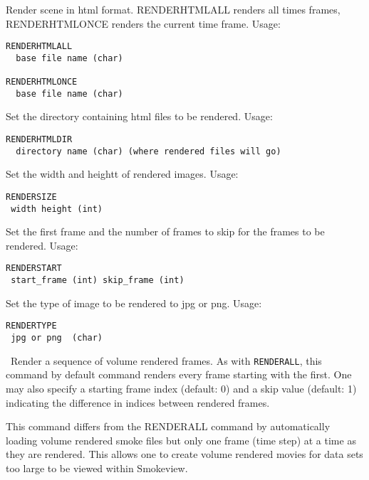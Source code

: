 \documentclass[11pt,twoside]{book}
\begin{document}
Render scene in html format.
RENDERHTMLALL renders all times frames, RENDERHTMLONCE renders the current time frame.
Usage:
\begin{lstlisting}
RENDERHTMLALL
  base file name (char)

RENDERHTMLONCE
  base file name (char)
\end{lstlisting}

Set the directory containing html files to be rendered. Usage:
\begin{lstlisting}
RENDERHTMLDIR
  directory name (char) (where rendered files will go)
\end{lstlisting}


Set the width and heightt of rendered images.
Usage:
\begin{lstlisting}
RENDERSIZE
 width height (int)
\end{lstlisting}

Set the first frame and the number of frames to skip for the frames to be rendered. Usage:
\begin{lstlisting}
RENDERSTART
 start_frame (int) skip_frame (int)
\end{lstlisting}

Set the type of image to be rendered to jpg or png. Usage:
\begin{lstlisting}
RENDERTYPE
 jpg or png  (char)
\end{lstlisting}

\ Render a sequence of volume rendered
frames. As with {\tt RENDERALL}, this command by default command
renders every frame starting with the first. One may also specify
a starting frame index (default: 0) and a skip value (default: 1)
indicating the difference in indices between rendered frames.

This command differs from the RENDERALL command by automatically
loading volume rendered smoke files but only one  frame (time
step) at a time as they are rendered.  This allows one to create
volume rendered movies for data sets too large to be viewed within
Smokeview.
\end{document}
